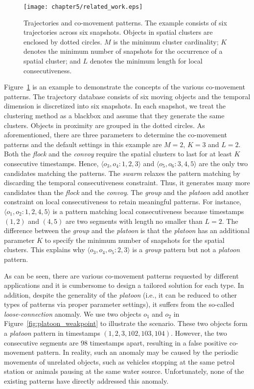 \begin{figure}[h]
\centering
\texttt{[image: chapter5/related\_work.eps]}
\caption{Trajectories and co-movement patterns. The example consists of six trajectories across six snapshots. Objects in spatial clusters are enclosed by dotted circles. $M$ is the minimum cluster cardinality; $K$ denotes the minimum number of snapshots for the occurrence of a spatial cluster; and $L$ denotes the minimum length for local consecutiveness.}
\label{fig:related_work}
\end{figure}

Figure~\ref{fig:related_work} is an example to demonstrate the concepts of the various co-movement patterns. The trajectory database consists of six moving objects and the temporal dimension is discretized into six snapshots. In each snapshot, we treat the clustering method as a blackbox and assume that they generate the same clusters. Objects in proximity are grouped in the dotted circles. As aforementioned, there are three parameters to determine the co-movement patterns and the default settings in this example are $M=2$, $K=3$ and $L=2$. Both the \emph{flock} and the \emph{convoy} require the spatial clusters to last for at least $K$ consecutive  timestamps. Hence, $\langle o_3,o_4:1,2,3 \rangle$ and $\langle o_5,o_6:3,4,5 \rangle$  are the only two candidates matching the patterns. The \textit{swarm} relaxes the pattern matching by discarding the temporal consecutiveness constraint. Thus, it generates many more candidates than the \textit{flock} and the \textit{convoy}. The \textit{group} and the \textit{platoon} add another constraint on local consecutiveness to retain meaningful patterns. For instance, $\langle o_1,o_2:1,2,4,5 \rangle$ is a pattern matching local consecutiveness because timestamps $(1,2)$ and $(4,5)$ are two segments with length no smaller than $L=2$. The difference between the \textit{group} and the \textit{platoon} is that the \textit{platoon} has an additional parameter $K$ to specify the minimum number of snapshots for the spatial clusters. This explains why $\langle o_3,o_4,o_5:2,3 \rangle$ is a  \textit{group} pattern but not a \textit{platoon} pattern.

As can be seen, there are various co-movement patterns requested by different applications and it is cumbersome to design a tailored solution for each type. In addition, despite the generality of the \emph{platoon} (i.e., it can be reduced to other types of patterns via proper parameter settings), it suffers from the so-called \emph{loose-connection} anomaly. We use two objects $o_1$ and $o_2$ in Figure~\ref{fig:platoon_weakpoint} to illustrate the scenario. These two objects form a \emph{platoon} pattern in timestamps $(1,2,3,102,103,104)$. However, the two consecutive segments are $98$ timestamps apart, resulting in a false positive co-movement pattern. In reality, such an anomaly may be caused  by the periodic movements of unrelated objects, such as vehicles stopping at the same petrol station or animals pausing at the same water source. 
Unfortunately, none of the existing patterns have directly addressed this anomaly.

